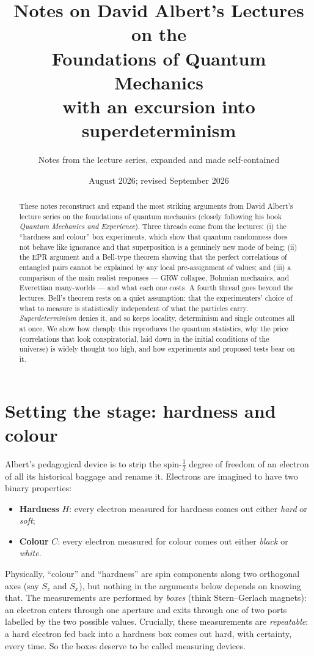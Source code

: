 \documentclass[11pt,a4paper]{article}
\title{Notes on David Albert's Lectures on the\\ Foundations of Quantum Mechanics\\[0.4em]
\large with an excursion into superdeterminism}
\author{Notes from the lecture series, expanded and made self-contained}
\date{August 2026; revised September 2026}
\theoremstyle{remark}
\begin{document}
\maketitle

\begin{abstract}
\noindent These notes reconstruct and expand the most striking arguments from David Albert's
lecture series on the foundations of quantum mechanics (closely following his book
\emph{Quantum Mechanics and Experience}). Three threads come from the lectures:
(i) the ``hardness and colour'' box experiments, which show that quantum
randomness does not behave like ignorance and that superposition is a genuinely new
mode of being;
(ii) the EPR argument and a Bell-type theorem showing that the perfect correlations of
entangled pairs cannot be explained by any local pre-assignment of values; and
(iii) a comparison of the main realist responses --- GRW collapse, Bohmian mechanics,
and Everettian many-worlds --- and what each one costs.
A fourth thread goes beyond the lectures. Bell's theorem rests on a quiet
assumption: that the experimenters' choice of what to measure is statistically
independent of what the particles carry. \emph{Superdeterminism} denies it, and so
keeps locality, determinism and single outcomes all at once. We show how cheaply
this reproduces the quantum statistics, why the price (correlations that look
conspiratorial, laid down in the initial conditions of the universe) is widely
thought too high, and how experiments and proposed tests bear on it.
\end{abstract}

\tableofcontents

\section{Setting the stage: hardness and colour}

Albert's pedagogical device is to strip the spin-$\tfrac12$ degree of freedom of an
electron of all its historical baggage and rename it. Electrons are imagined to have
two binary properties:
\begin{itemize}[nosep]
  \item \textbf{Hardness} $H$: every electron measured for hardness comes out
        either \emph{hard} or \emph{soft};
  \item \textbf{Colour} $C$: every electron measured for colour comes out
        either \emph{black} or \emph{white}.
\end{itemize}
Physically, ``colour'' and ``hardness'' are spin components along two orthogonal axes
(say $S_z$ and $S_x$), but nothing in the arguments below depends on knowing that.
The measurements are performed by \emph{boxes} (think Stern--Gerlach magnets): an
electron enters through one aperture and exits through one of two ports labelled by
the two possible values. Crucially, these measurements are \emph{repeatable}: a
hard electron fed back into a hardness box comes out hard, with certainty, every
time. So the boxes deserve to be called measuring devices.
\end{document}
